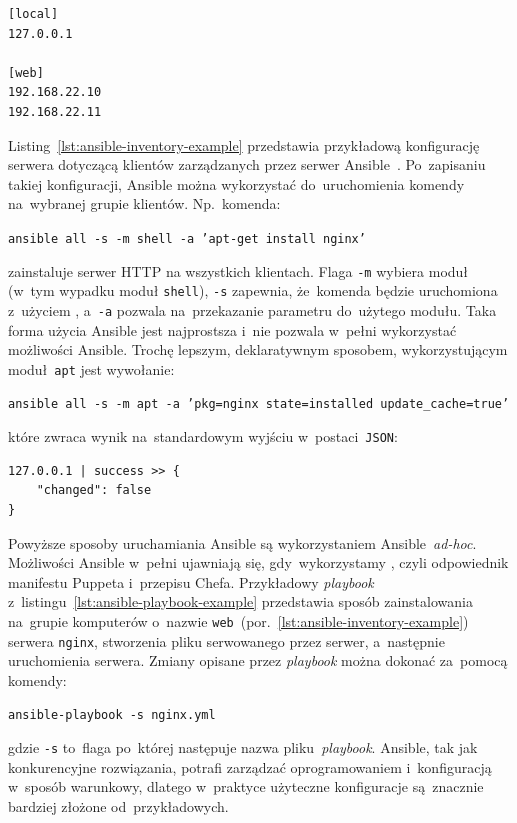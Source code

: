 \documentclass[thesis]{subfiles}
\begin{document}
\begin{lstlisting}[numbers=none,caption={Przykładowy plik konfiguracyjny klientów serwera Ansible (w~numenklaturze Ansible nazywany \hrefemph{http://docs.ansible.com/ansible/intro_inventory.html}{Inventory file}), zwyczajowo zapisywany w~\texttt{/etc/ansible/hosts}, definiujący adresy~IP zarządzanych klientów},label=lst:ansible-inventory-example]
[local]
127.0.0.1

[web]
192.168.22.10
192.168.22.11
\end{lstlisting}

Listing~\ref{lst:ansible-inventory-example} przedstawia przykładową konfigurację serwera dotyczącą klientów zarządzanych przez serwer Ansible~\cite{ansible-example}. Po~zapisaniu takiej konfiguracji, Ansible można wykorzystać do~uruchomienia komendy na~wybranej grupie klientów. Np.~komenda:
\begin{center}
\texttt{ansible all -s -m shell -a 'apt-get install nginx'}
\end{center}
zainstaluje serwer HTTP  na wszystkich klientach. Flaga \texttt{-m} wybiera moduł (w~tym wypadku moduł \texttt{shell}), \texttt{-s} zapewnia, że~komenda będzie uruchomiona z~użyciem , a~\texttt{-a} pozwala na~przekazanie parametru do~użytego modułu. Taka forma użycia Ansible jest najprostsza i~nie pozwala w~pełni wykorzystać możliwości Ansible. Trochę lepszym, deklaratywnym sposobem, wykorzystującym moduł~\texttt{apt} jest wywołanie:
\begin{center}
\texttt{ansible all -s -m apt -a 'pkg=nginx state=installed update\_cache=true'}
\end{center}
które zwraca wynik na~standardowym wyjściu w~postaci~\texttt{JSON}:
\begin{lstlisting}[numbers=none,frame=none]
127.0.0.1 | success >> {
    "changed": false
}
\end{lstlisting}
Powyższe sposoby uruchamiania Ansible są wykorzystaniem Ansible~\emph{ad-hoc}. Możliwości Ansible w~pełni ujawniają się, gdy~wykorzystamy , czyli odpowiednik manifestu Puppeta i~przepisu Chefa. Przykładowy \emph{playbook} z~listingu~\ref{lst:ansible-playbook-example} przedstawia sposób zainstalowania na~grupie komputerów o~nazwie \texttt{web}~(por.~\ref{lst:ansible-inventory-example}) serwera \texttt{nginx}, stworzenia pliku serwowanego przez serwer, a~następnie uruchomienia  serwera. Zmiany opisane przez \emph{playbook} można dokonać za~pomocą komendy:\mynobreakpar
\begin{center}
\texttt{ansible-playbook -s nginx.yml}
\end{center}
gdzie \texttt{-s} to~flaga po~której następuje nazwa pliku~\emph{playbook}. Ansible, tak jak konkurencyjne rozwiązania, potrafi zarządzać oprogramowaniem i~konfiguracją w~sposób warunkowy, dlatego w~praktyce użyteczne konfiguracje są~znacznie bardziej złożone od~przykładowych.
\end{document}
